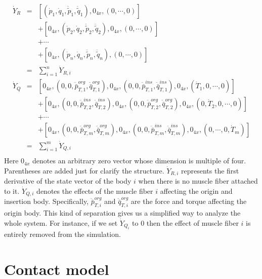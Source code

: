 \documentclass[a4paper,10pt]{article}
\begin{document}
\begin{eqnarray*}\label{dotY2}
\dot{Y}_R & = & [ (\dot{p}_1, \dot{q}_1, \ddot{\tilde{p}}_1, \ddot{\tilde{q}}_1),
                  0_{4x}, (0, \cdots , 0)]\\
          &   & + [ 0_{4x}, (\dot{p}_2, \dot{q}_2, \ddot{\tilde{p}}_2, \ddot{\tilde{q}}_2),
                  0_{4x}, (0, \cdots , 0)]\\
          &   & + \cdots\\
          &   & + [ 0_{4x}, (\dot{p}_n, \dot{q}_n, \ddot{\tilde{p}}_n, \ddot{\tilde{q}}_n),
                  (0, \cdots , 0)]\\
          & = & \sum_{i=1}^{n}{\dot{Y}_{R,i}}\\
\dot{Y}_Q & = & [ 0_{4x}, (0, 0, \ddot{\bar{p}}_{T,1}^{org}, \ddot{\bar{q}}_{T,1}^{org}),
                  0_{4x}, (0, 0, \ddot{\bar{p}}_{T,1}^{ins}, \ddot{\bar{q}}_{T,1}^{ins}),
                  0_{4x}, (\dot{T}_1, 0, \cdots, 0)]\\
          &   & + [ 0_{4x}, (0, 0, \ddot{\bar{p}}_{T,2}^{ins}, \ddot{\bar{q}}_{T,2}^{ins}),
                    0_{4x}, (0, 0, \ddot{\bar{p}}_{T,2}^{org}, \ddot{\bar{q}}_{T,2}^{org}),
                    0_{4x}, (0, \dot{T}_2, 0, \cdots, 0)]\\
          &   & + \cdots\\
          &   & + [ 0_{4x}, (0, 0, \ddot{\bar{p}}_{T,m}^{org}, \ddot{\bar{q}}_{T,m}^{org}),
                    0_{4x}, (0, 0, \ddot{\bar{p}}_{T,m}^{ins}, \ddot{\bar{q}}_{T,m}^{ins}),
                    0_{4x}, (0, \cdots, 0, \dot{T}_m)]\\
          & = & \sum_{i=1}^{m}{\dot{Y}_{Q,i}}\\
\end{eqnarray*}
Here $0_{4x}$ denotes an arbitrary zero vector whose dimension is multiple of four.
Parentheses are added just for clarify the structure.
$\dot{Y}_{R,i}$ represents the first derivative of the state vector of the body $i$
when there is no muscle fiber attached to it. $\dot{Y}_{Q,i}$ denotes the effects of
the muscle fiber $i$ affecting the origin and insertion body. Specifically,
$ \ddot{\bar{p}}_{T,i}^{org} $ and $ \ddot{\bar{q}}_{T,i}^{org} $ are the force and
torque affecting the origin body. This kind of separation gives us a simplified
way to analyze the whole system. For instance, if we set $\dot{Y}_{Q_i}$ to 0 then
the effect of muscle fiber $i$ is entirely removed from the simulation.

\section{Contact model}
\end{document}
